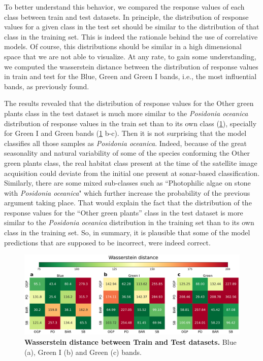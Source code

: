 To better understand this behavior, we compared the response values of each
class between train and test datasets. In principle, the distribution of
response values for a given class in the test set should be similar to the
distribution of that class in the training set. This is indeed the rationale
behind the use of correlative models. Of course, this distributions should be
similar in a high dimensional space that we are not able to visualize. At any
rate, to gain some understanding, we computed the wasserstein distance between
the distribution of response values in train and test for the Blue, Green and
Green I bands, i.e., the most influential bands, as previously found.

The results revealed that the distribution of response values for the Other
green plants class in the test dataset is much more similar to the
\textit{Posidonia oceanica} distribution of response values in the train set
than to its own class (\cref{fig:similarity_train_test_classes}), specially for
Green I and Green bands (\cref{fig:similarity_train_test_classes} b-c). Then it
is not surprising that the model classifies all those samples as
\textit{Posidonia oceanica}. Indeed, because of the great seasonality and
natural variability of some of the species conforming the Other green plants
class, the real habitat class present at the time of the satellite image
acquisition could deviate from the initial one present at sonar-based
classification. Similarly, there are some mixed sub-classes
such as ``Photophilic algae on stone with \textit{Posidonia oceanica}" which
further increase the probability of the previous argument taking place. That
would explain the fact that the distribution of the response values for the
``Other green plants'' class in the test dataset is more similar to the
\textit{Posidonia oceanica} distribution in the training set than to its own
class in the training set. So, in summary, it is plausible that some of the
model predictions that are supposed to be incorrect, were indeed correct.

\begin{figure}[H]
    \centering

    \includegraphics[width=\textwidth]{Figures/Wasserstein_distance_by_Classes_&_Datasets.pdf}
    \caption[Wasserstein distance between Train and Test
        datasets]{\textbf{Wasserstein
            distance between Train and Test datasets.} Blue
        (a), Green I (b) and Green (c) bands.}
    \label{fig:similarity_train_test_classes}
\end{figure}

